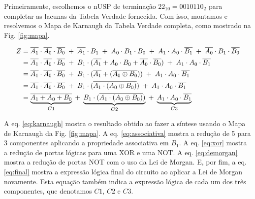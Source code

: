 \documentclass[a4,12pt]{horizon-theme}
\begin{document}
Primeiramente, escolhemos o nUSP de terminação $22_{10} = 0010110_{2}$ para completar as lacunas da Tabela Verdade fornecida. Com isso, montamos e resolvemos o Mapa de Karnaugh da Tabela Verdade completa, como mostrado na Fig. \ref{fig:mapa}.



\begin{align}
  \label{eq:karnaugh}
  Z  & = \overline{A_1} \cdot \overline{A_0} \cdot \overline{B_0} \;+\;
  \overline{A_1} \cdot B_1 \;+\;
  A_0 \cdot B_1 \cdot B_0 \;+\;
  A_1 \cdot A_0 \cdot \overline{B_1} \;+\;
  \overline{A_0} \cdot B_1 \cdot \overline{B_0}                    \\
  \label{eq:associativa}
  {} & = \overline{A_1} \cdot \overline{A_0} \cdot \overline{B_0} \;+\;
  B_1 \cdot (\overline{A_1} + A_0 \cdot B_0 + \overline{A_0} \cdot \overline{B_0}) \;+\;
  A_1 \cdot A_0 \cdot \overline{B_1}                        \\
  \label{eq:xor}
  {} & = \overline{A_1} \cdot \overline{A_0} \cdot \overline{B_0} \;+\;
  B_1 \cdot (\overline{A_1} + (\overline{A_0 \oplus B_0})) \;+\;
  A_1 \cdot A_0 \cdot \overline{B_1}                        \\
  \label{eq:demorgan}
  {} & = \overline{A_1} \cdot \overline{A_0} \cdot \overline{B_0} \;+\;
  B_1 \cdot (\overline{A_1 \cdot (A_0 \oplus B_0)}) \;+\;
  A_1 \cdot A_0 \cdot \overline{B_1}                        \\
  \label{eq:final}
  {} & = \underbrace{\overline{A_1 + A_0 + B_0}}_{C1} \;+\;
  \underbrace{B_1 \cdot (\overline{A_1 \cdot (A_0 \oplus B_0)})}_{C2} \;+\;
  \underbrace{A_1 \cdot A_0 \cdot \overline{B_1}}_{C3}
\end{align}



A eq. \eqref{eq:karnaugh} mostra o resultado obtido ao fazer a síntese usando o Mapa de Karnaugh da Fig. \ref{fig:mapa}. A eq. \eqref{eq:associativa} mostra a redução de 5 para 3 componentes aplicando a propriedade associativa em $B_1$. A eq. \eqref{eq:xor} mostra a redução de portas lógicas para uma XOR e uma NOT. A eq. \eqref{eq:demorgan} mostra a redução de portas NOT com o uso da Lei de Morgan. E, por fim, a eq. \eqref{eq:final} mostra a expressão lógica final do circuito ao aplicar a Lei de Morgan novamente. Esta equação também indica a expressão lógica de cada um dos três componentes, que denotamos $C1$, $C2$ e $C3$.
\end{document}

